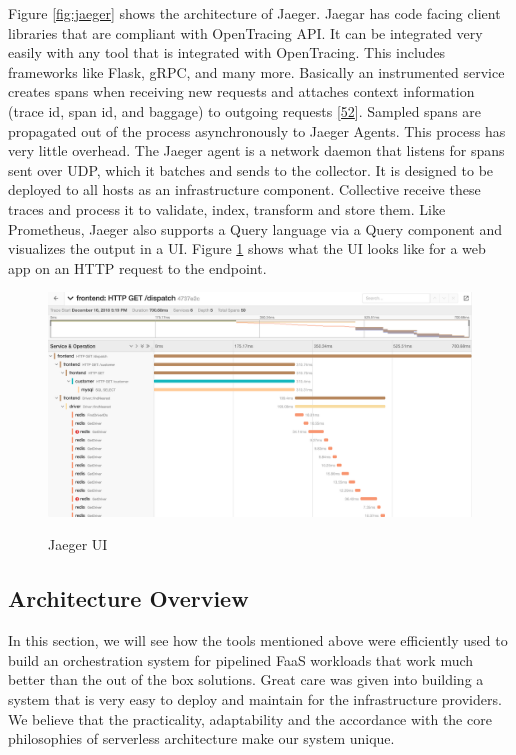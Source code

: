 \documentclass[12pt,titlepage]{article}
\begin{document}
Figure \ref{fig:jaeger} shows the architecture of Jaeger. Jaegar has code facing client libraries
that are compliant with OpenTracing API. It can be integrated very easily with
any tool that is integrated with OpenTracing. This includes frameworks like
Flask, gRPC, and many more. Basically an instrumented service creates spans when
receiving new requests and attaches context information (trace id, span id, and
baggage) to outgoing requests \hyperref[ref:52]{[52}]. Sampled spans are propagated out of
the process asynchronously to Jaeger Agents. This process has very little
overhead. The Jaeger agent is a network daemon that listens for spans sent over
UDP, which it batches and sends to the collector. It is designed to be deployed
to all hosts as an infrastructure component. Collective receive these traces and
process it to validate, index, transform and store them. Like Prometheus, Jaeger
also supports a Query language via a Query component and visualizes the output
in a UI. Figure \ref{fig:jaeger_traces} shows what the UI looks like for a web app on an HTTP request to
the endpoint.
\begin{figure}[!h]
    \caption{Jaeger UI}
    \centering
    \includegraphics[width=130mm]{./thesis_images/jaeger_traces.png}
    \label{fig:jaeger_traces}
\end{figure}

\subsection{Architecture Overview}
\label{sec:org6872281}
In this section, we will see how the tools mentioned above were efficiently used
to build an orchestration system for pipelined FaaS workloads that work much better than
the out of the box solutions. Great care was given into building a system that
is very easy to deploy and maintain for the infrastructure providers. We believe
that the practicality, adaptability and the accordance with the core
philosophies of serverless architecture make our system unique.
\end{document}
